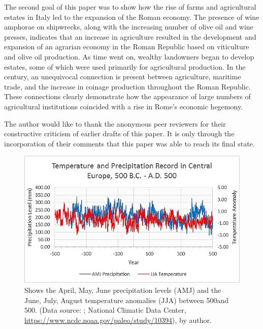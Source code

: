 The second goal of this paper was to show how the rise of farms and agricultural estates in Italy led to the expansion of the Roman economy. The presence of wine amphorae on shipwrecks, along with the increasing number of olive oil and wine presses, indicates that an increase in agriculture resulted in the development and expansion of an agrarian economy in the Roman Republic based on viticulture and olive oil production. As time went on, wealthy landowners began to develop estates, some of which were used primarily for agricultural production. In the  century\BC, an unequivocal connection is present between agriculture, maritime trade, and the increase in coinage production throughout the Roman Republic. These connections clearly demonstrate how the appearance of large numbers of agricultural institutions coincided with a rise in Rome’s economic hegemony.

\myseparator

The author would like to thank the anonymous peer reviewers for their constructive criticism of earlier drafts of this paper. It is only through the incorporation of their comments that this paper was able to reach its final state.
\\[1em]
	
	\begin{figure}[!h]
		\includegraphics[width=\linewidth]{figures/Davis_Agroeconomy_Fig1.jpg}
		\centering
		\caption{Shows the April, May, June precipitation levels (AMJ) and the June, July, August temperature anomalies (JJA) between 500\BC and 500\AD. (Data source: \textcite{Büntgen_2011b}; National Climatic Data Center, \url{https://www.ncdc.noaa.gov/paleo/study/10394}), by author.}
		\label{fig:DavisFig1}
	\end{figure}	
	
